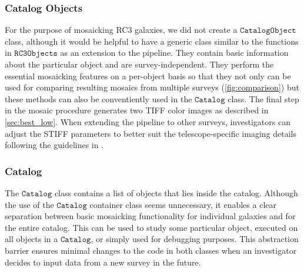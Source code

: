 \documentclass[authoryear, 12pt,5p, times]{elsarticle}
\begin{document}
	\subsubsection{Catalog Objects}
	For the purpose of mosaicking RC3 galaxies, we did not create a $\texttt{CatalogObject}$ class, although it would be helpful to have a generic class similar to the functions in $\texttt{RC3Objects}$ as an extension to the pipeline. They contain basic information about the particular object and are survey-independent. They perform the essential mosaicking features on a per-object basis so that they not only can be used for comparing resulting mosaics from multiple surveys (\autoref{fig:comparison}) but these methods can also be conventiently used in the $\texttt{Catalog}$ class. The final step in the mosaic procedure generates two TIFF color images as described in \autoref{sec:best_low}.  When extending the pipeline to other surveys, investigators can adjust the STIFF parameters to better suit the telescope-specific imaging details following the guidelines in \citealp{stiff}.
    \subsubsection{Catalog}
	The $\texttt{Catalog}$ class contains a list of objects that lies inside the catalog. Although the use of the $\texttt{Catalog}$ container class seems unnecessary, it enables a clear separation between basic mosaicking functionality for individual galaxies and for the entire catalog. This can be used to study some particular object, executed on all objects in a $\texttt{Catalog}$, or simply used for debugging purposes. This abstraction barrier ensures minimal changes to the code in both classes when an investigator decides to input data from a new survey in the future.
\end{document}
